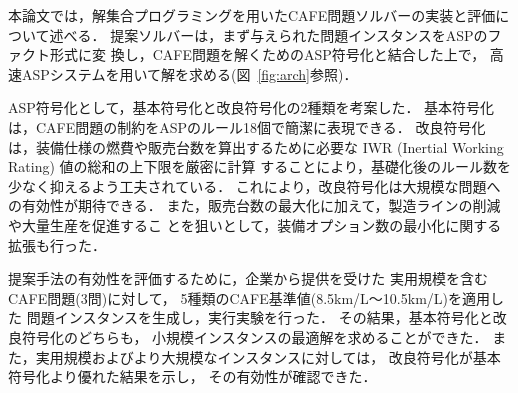 本論文では，解集合プログラミングを用いたCAFE問題ソルバーの実装と評価に
ついて述べる．
提案ソルバーは，まず与えられた問題インスタンスをASPのファクト形式に変
換し，CAFE問題を解くためのASP符号化と結合した上で，
高速ASPシステムを用いて解を求める(図~\ref{fig:arch}参照)．

ASP符号化として，基本符号化と改良符号化の2種類を考案した．
基本符号化は，CAFE問題の制約をASPのルール18個で簡潔に表現できる．
改良符号化は，装備仕様の燃費や販売台数を算出するために必要な
IWR (Inertial Working Rating) 値の総和の上下限を厳密に計算
することにより，基礎化後のルール数を少なく抑えるよう工夫されている．
これにより，改良符号化は大規模な問題への有効性が期待できる．
また，販売台数の最大化に加えて，製造ラインの削減や大量生産を促進するこ
とを狙いとして，装備オプション数の最小化に関する拡張も行った．


提案手法の有効性を評価するために，企業から提供を受けた
実用規模を含むCAFE問題(3問)に対して，
5種類のCAFE基準値(8.5km/L〜10.5km/L)を適用した
問題インスタンスを生成し，実行実験を行った．
その結果，基本符号化と改良符号化のどちらも，
小規模インスタンスの最適解を求めることができた．
また，実用規模およびより大規模なインスタンスに対しては，
改良符号化が基本符号化より優れた結果を示し，
その有効性が確認できた．

